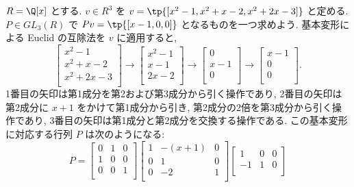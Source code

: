 \documentclass[12pt,twoside]{jarticle}
\begin{document}
\begin{example}
\label{example:Euclid-v}
  $R=\Q[x]$ とする.
  $v\in R^3$ を $v=\tp{[x^2-1,x^2+x-2,x^2+2x-3]}$ と定める.
  $P\in GL_3(R)$ で $Pv = \tp{[x-1,0,0]}$ となるものを一つ求めよう. 
  基本変形による Euclid の互除法を $v$ に適用すると,
  \begin{equation*}
    \begin{bmatrix}
      x^2 -1 \\ x^2+x-2 \\ x^2+2x-3 \\
    \end{bmatrix}
    \to
    \begin{bmatrix}
      x^2-1 \\ x-1 \\ 2x-2 \\
    \end{bmatrix}
    \to
    \begin{bmatrix}
      0 \\ x-1 \\ 0 \\
    \end{bmatrix}
    \to
    \begin{bmatrix}
      x-1 \\ 0 \\ 0 \\
    \end{bmatrix}.
  \end{equation*}
  1番目の矢印は第1成分を第2および第3成分から引く操作であり,
  2番目の矢印は第2成分に $x+1$ をかけて第1成分から引き,
  第2成分の2倍を第3成分から引く操作であり,
  3番目の矢印は第1成分と第2成分を交換する操作である.
  この基本変形に対応する行列 $P$ は次のようになる:
  \begin{equation*}
    P = 
    \begin{bmatrix}
      0 & 1 & 0 \\
      1 & 0 & 0 \\
      0 & 0 & 1 \\
    \end{bmatrix}
    \begin{bmatrix}
      1 & -(x+1) & 0 \\
      0 &   1    & 0 \\
      0 &  -2    & 1 \\
    \end{bmatrix}
    \begin{bmatrix}
       1 & 0 & 0 \\
      -1 & 1 & 0 \\

\end{bmatrix}
\end{equation*}
\end{example}
\end{document}
